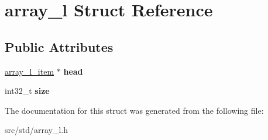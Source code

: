 \hypertarget{structarray__l}{}\section{array\+\_\+l Struct Reference}
\label{structarray__l}
\subsection*{Public Attributes}
\begin{DoxyCompactItemize}
\item 
\mbox{\label{structarray__l_aab2031b1a5135c0ccb5eb8b26814b835}} 
\hyperlink{structarray__l__item}{array\+\_\+l\+\_\+item} $\ast$ {\bfseries head}
\item 
\mbox{\label{structarray__l_a97a1764e4a900b47850c7eb25e96319d}} 
int32\+\_\+t {\bfseries size}
\end{DoxyCompactItemize}


The documentation for this struct was generated from the following file\+:\begin{DoxyCompactItemize}
\item 
src/std/array\+\_\+l.\+h\end{DoxyCompactItemize}
